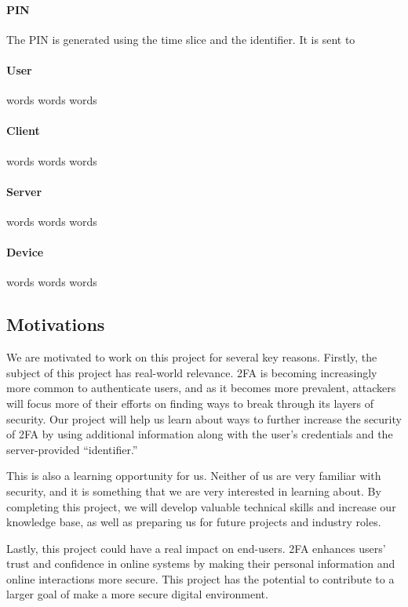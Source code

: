 \documentclass[11pt]{article} %
\begin{document}
\paragraph{PIN} The PIN is generated using the time slice and the
identifier. It is sent to 
\paragraph{User} words words words
\paragraph{Client} words words words
\paragraph{Server} words words words
\paragraph{Device} words words words

\subsection{Motivations}

We are motivated to work on this project for several key reasons.
Firstly, the subject of this project has real-world relevance. 2FA is
becoming increasingly more common to authenticate users, and as it
becomes more prevalent, attackers will focus more of their efforts on
finding ways to break through its layers of security. Our project will
help us learn about ways to further increase the security of 2FA by
using additional information along with the user's credentials and the
server-provided ``identifier.''

This is also a learning opportunity for us. Neither of us are very
familiar with security, and it is something that we are very interested
in learning about. By completing this project, we will develop valuable
technical skills and increase our knowledge base, as well as preparing
us for future projects and industry roles.

Lastly, this project could have a real impact on end-users. 2FA enhances
users' trust and confidence in online systems by making their personal
information and online interactions more secure. This project has the
potential to contribute to a larger goal of make a more secure digital
environment. 
\end{document}
